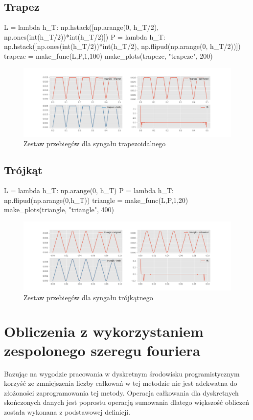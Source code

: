 \documentclass[13pt]{article}
\begin{document}
\subsection{Trapez}
\begin{pyverbatim}
L = lambda h_T: np.hstack([np.arange(0, h_T/2), np.ones(int(h_T/2))*int(h_T/2)])
P = lambda h_T: np.hstack([np.ones(int(h_T/2))*int(h_T/2), np.flipud(np.arange(0, h_T/2))])
trapeze = make_func(L,P,1,100)
make_plots(trapeze, "trapeze", 200)
\end{pyverbatim}
\begin{figure}[!h]
	\centering
	\includegraphics[width=\textwidth]{trapeze.png}
	\caption{Zestaw przebiegów dla syngału trapezoidalnego}
\end{figure}


\subsection{Trójkąt}
\begin{pyverbatim}
L = lambda h_T: np.arange(0, h_T)
P = lambda h_T: np.flipud(np.arange(0,h_T))
triangle = make_func(L,P,1,20)
make_plots(triangle, "triangle", 400)
\end{pyverbatim}
\begin{figure}[!h]
	\centering
	\includegraphics[width=\textwidth]{triangle.png}
	\caption{Zestaw przebiegów dla syngału trójkątnego}
\end{figure}

\newpage

\section{Obliczenia z wykorzystaniem zespolonego szeregu fouriera}
Bazując na wygodzie pracowania w dyskretnym środowisku programistycznym korzyść ze zmniejszenia liczby całkowań w tej metodzie nie jest adekwatna do złożoności zaprogramowania tej metody. Operacja całkowania dla dyskretnych skończonych danych jest poprostu operacją sumowania dlatego większość obliczeń została wykonana z podstawowej definicji.
\end{document}
